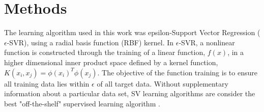 \documentclass[12]{article}
\begin{document}

\section*{Methods}

\noindent The learning algorithm used in this work was epsilon-Support Vector Regression
($\epsilon$-SVR), using a radial basis function (RBF) kernel. In $\epsilon$-SVR,
a nonlinear function is constructed through the training of a linear
function, $f(x)$, in a higher dimensional inner product space
defined by a kernel function, $K(x_i,x_j)=\phi (x_i)^T \phi (x_j)$. The
objective of the function training is to ensure all training data lies
within $\epsilon$ of all target data. Without supplementary information about a
particular data set, SV learning algorithms are consider the best
"off-the-shelf" supervised learning algorithm \cite{class_svm}. \\
\end{document}
